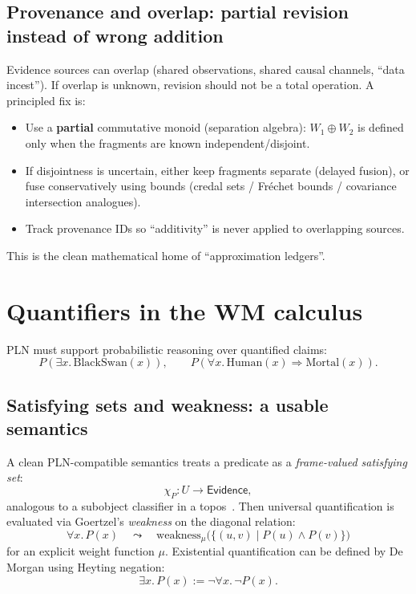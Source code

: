 \documentclass[11pt]{article}
\newcommand{\Evidence}{\mathsf{Evidence}}
\newcommand{\revise}{\mathbin{\oplus}}   %
\begin{document}
\subsection{Provenance and overlap: partial revision instead of wrong addition}

Evidence sources can overlap (shared observations, shared causal channels, ``data incest'').
If overlap is unknown, revision should not be a total operation. A principled fix is:

\begin{itemize}[leftmargin=2em]
\item Use a \textbf{partial} commutative monoid (separation algebra):
$W_1 \revise W_2$ is defined only when the fragments are known independent/disjoint.
\item If disjointness is uncertain, either keep fragments separate (delayed fusion),
or fuse conservatively using bounds (credal sets / Fr\'echet bounds / covariance intersection analogues).
\item Track provenance IDs so ``additivity'' is never applied to overlapping sources.
\end{itemize}

This is the clean mathematical home of ``approximation ledgers''.

\section{Quantifiers in the WM calculus}

PLN must support probabilistic reasoning over quantified claims:
\[
  P(\exists x.\,\mathrm{BlackSwan}(x)),\qquad
  P(\forall x.\,\mathrm{Human}(x)\Rightarrow \mathrm{Mortal}(x)).
\]

\subsection{Satisfying sets and weakness: a usable semantics}

A clean PLN-compatible semantics treats a predicate as a \emph{frame-valued satisfying set}:
\[
  \chi_P : U \to \Evidence,
\]
analogous to a subobject classifier in a topos~\cite{MacLaneMoerdijk}.
Then universal quantification is evaluated via Goertzel's \emph{weakness} on the diagonal relation:
\[
  \forall x.\,P(x)
  \quad\leadsto\quad
  \mathrm{weakness}_\mu\big(\{(u,v)\mid P(u)\wedge P(v)\}\big)
\]
for an explicit weight function $\mu$.
Existential quantification can be defined by De Morgan using Heyting negation:
\[
  \exists x.\,P(x) := \neg \forall x.\,\neg P(x).
\]
\end{document}
